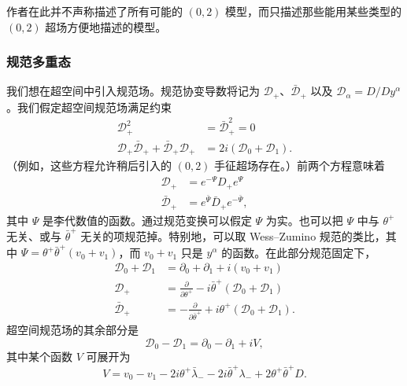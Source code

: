 作者在此并不声称描述了所有可能的 $(0,2)$ 模型，而只描述那些能用某些类型的 $(0,2)$ 超场方便地描述的模型。

\subsubsection*{规范多重态}

我们想在超空间中引入规范场。规范协变导数将记为 $\mathcal{D}_+$、$\bar{\mathcal{D}}_+$ 以及 $\mathcal{D}_\alpha=D/Dy^\alpha$。我们假定超空间规范场满足约束
\begin{equation}
\begin{aligned} \mathcal{D}_+^2 &= \bar{\mathcal{D}}_+^2=0\\ \mathcal{D}_+\bar{\mathcal{D}}_++\bar{\mathcal{D}}_+\mathcal{D}_+ &= 2i(\mathcal{D}_0+\mathcal{D}_1). \end{aligned}\tag{6.3}
\end{equation}
（例如，这些方程允许稍后引入的 $(0,2)$ 手征超场存在。）前两个方程意味着
\begin{equation}
\begin{aligned} \mathcal{D}_+ &= e^{-\Psi}D_+e^{\Psi}\\ \bar{\mathcal{D}}_+ &= e^{\bar\Psi}\bar D_+e^{-\bar\Psi}, \end{aligned}\tag{6.4}
\end{equation}
其中 $\Psi$ 是李代数值的函数。通过规范变换可以假定 $\Psi$ 为实。也可以把 $\Psi$ 中与 $\theta^+$ 无关、或与 $\bar\theta^+$ 无关的项规范掉。特别地，可以取 Wess--Zumino 规范的类比，其中 $\Psi=\theta^+\bar\theta^+(v_0+v_1)$，而 $v_0+v_1$ 只是 $y^\alpha$ 的函数。在此部分规范固定下，
\begin{equation}
\begin{aligned} \mathcal{D}_0+\mathcal{D}_1 &= \partial_0+\partial_1+i(v_0+v_1)\\ \mathcal{D}_+ &= \frac{\partial}{\partial\theta^+}-i\bar\theta^+(\mathcal{D}_0+\mathcal{D}_1)\\ \bar{\mathcal{D}}_+ &= -\frac{\partial}{\partial\bar\theta^+}+i\theta^+(\mathcal{D}_0+\mathcal{D}_1). \end{aligned}\tag{6.5}
\end{equation}
超空间规范场的其余部分是
\begin{equation}
\mathcal{D}_0-\mathcal{D}_1=\partial_0-\partial_1+iV,\tag{6.6}
\end{equation}
\label{op:77}
其中某个函数 $V$ 可展开为
\begin{equation} V=v_0-v_1-2i\theta^+\bar\lambda_--2i\bar\theta^+\lambda_-+2\theta^+\bar\theta^+D.\tag{6.7}
\end{equation}

